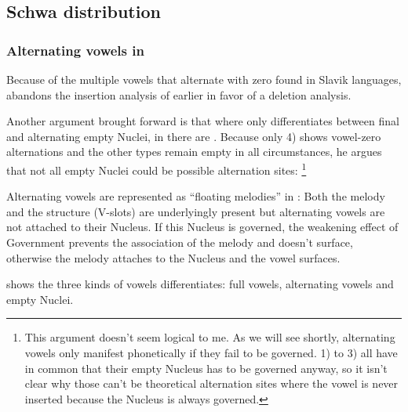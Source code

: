 \subsection{Schwa distribution}

\subsubsection{Alternating vowels in \CVCV}
Because of the multiple vowels that alternate with zero found in Slavik
languages, \textcite{scheer2004} abandons the insertion analysis of earlier
\SGP in favor of a deletion analysis.

Another argument brought forward is that where \SGP only differentiates
between final and alternating empty Nuclei, in \CVCV there are
.
Because only 4) shows vowel-zero alternations and the other types
remain empty in all circumstances, he argues that not all empty
Nuclei could be possible alternation sites:
%
\footnote{This argument doesn't seem logical to me.
  As we will see shortly, alternating vowels only manifest phonetically
  if they fail to be governed. 1) to 3) all have in common
  that their empty Nucleus has to be governed anyway, so it isn't
  clear why those can't be theoretical alternation sites where
  the vowel is never inserted because the Nucleus is always governed.}

Alternating vowels are represented as \enquote{floating melodies} in \CVCV:
Both the melody and the structure (V-slots) are underlyingly present
but alternating vowels are not attached to their Nucleus.
If this Nucleus is governed, the weakening effect of Government
prevents the association of the melody and doesn't surface, otherwise
the melody attaches to the Nucleus and the vowel surfaces.

 shows the three kinds of vowels
\CVCV differentiates: full vowels, alternating vowels and empty Nuclei.


